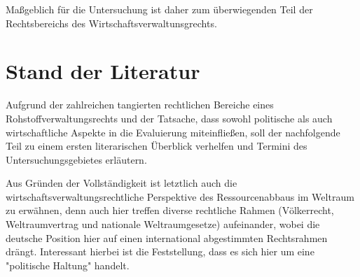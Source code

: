 \documentclass[12pt,a4paper,oneside]{book} %
\begin{document}
Maßgeblich für die Untersuchung ist daher zum überwiegenden Teil der Rechtsbereichs des Wirtschaftsverwaltunsgrechts.


\section{Stand der Literatur}
Aufgrund der zahlreichen tangierten rechtlichen Bereiche eines Rohstoffverwaltungsrechts und der Tatsache, dass sowohl politische als auch wirtschaftliche Aspekte in die Evaluierung miteinfließen, soll der nachfolgende Teil zu einem ersten literarischen Überblick verhelfen und Termini des Untersuchungsgebietes erläutern.


Aus Gründen der Vollständigkeit ist letztlich auch die wirtschaftsverwaltungsrechtliche Perspektive des Ressourcenabbaus im Weltraum zu erwähnen, denn auch hier treffen diverse rechtliche Rahmen (Völkerrecht, Weltraumvertrag und nationale Weltraumgesetze) aufeinander, wobei die deutsche Position hier auf einen international abgestimmten Rechtsrahmen drängt. Interessant hierbei ist die Feststellung, dass es sich hier um eine "politische Haltung" handelt.
\end{document}
